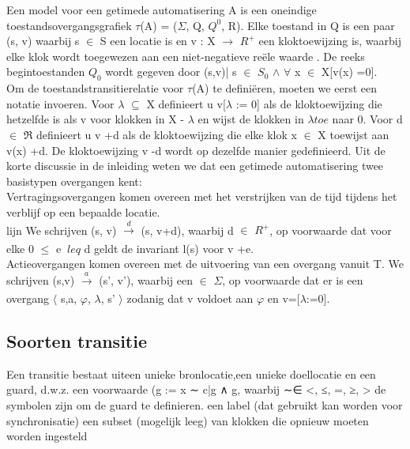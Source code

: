 \documentclass{article}
\begin{document}
	
	
	Een model voor een getimede automatisering A is een oneindige toestandsovergangsgrafiek $\tau$(A) = ($\Sigma$, Q, $Q^{0}$, R). Elke toestand in Q is een paar (s, v) waarbij s $\in$ S een locatie is en v : X $\rightarrow$ $R^{+}$ een kloktoewijzing is, waarbij elke klok wordt toegewezen aan een niet-negatieve reële waarde . De reeks begintoestanden $Q_0$ wordt gegeven door {(s,v)| s $\in$ $S_0$ $\wedge$ $\forall$ x $\in$ X[v(x) =0]}. \\
	\newline
	Om de toestandstransitierelatie voor $\tau$(A) te definiëren, moeten we eerst een notatie invoeren. Voor $\lambda$ $\subseteq$ X definieert u v[$\lambda$ := 0] als de kloktoewijzing die hetzelfde is als v voor klokken in X - $\lambda$ en wijst de klokken in $\lambda toe $ naar 0. Voor d $\in$ $\Re$ definieert u v +d als de kloktoewijzing die elke klok x $\in$ X toewijst aan v(x) +d. De kloktoewijzing v -d wordt op dezelfde manier gedefinieerd.
	Uit de korte discussie in de inleiding weten we dat een getimede automatisering twee basistypen overgangen kent: \\
	\newline
	Vertragingsovergangen komen overeen met het verstrijken van de tijd tijdens het verblijf op een bepaalde locatie. \\ \nieuwe lijn
	We schrijven (s, v) $\xrightarrow[]{d}$ (s, v+d), waarbij d $\in$ $R^{+}$, op voorwaarde dat voor elke 0 $\leq$ e $\ leq$ d geldt de invariant l(s) voor v +e. \\
	\newline
	Actieovergangen komen overeen met de uitvoering van een overgang vanuit T. We schrijven (s,v) $\xrightarrow[]{a}$ (s', v'), waarbij een $\in$ $\Sigma$, op voorwaarde dat er is een overgang $\langle$ s,a, $\varphi$, $\lambda$, s' $\rangle$ zodanig dat v voldoet aan $\varphi$ en v=[$\lambda$:=0]. \\
	\newline
	\subsection{Soorten transitie}
	
	Een transitie bestaat uiteen unieke bronlocatie,een unieke doellocatie en 
	een guard, d.w.z. een voorwaarde (g := x ∼ c|g ∧ g, waarbij
	∼∈ {<, ≤, =, ≥, >} de symbolen zijn om de guard te definieren.
	een label (dat gebruikt kan worden voor synchronisatie)
	een subset (mogelijk leeg) van klokken die opnieuw moeten worden ingesteld
	
\end{document}
